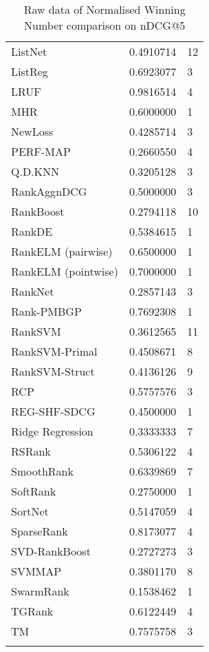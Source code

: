 \begin{longtable}{l|l|l}
ListNet & 0.4910714 & 12 \\ 
ListReg & 0.6923077 & 3 \\ 
LRUF & 0.9816514 & 4 \\ 
MHR & 0.6000000 & 1 \\ 
NewLoss & 0.4285714 & 3 \\ 
PERF-\acs{MAP} & 0.2660550 & 4 \\ 
Q.D.KNN & 0.3205128 & 3 \\ 
RankAgg\acs{nDCG} & 0.5000000 & 3 \\ 
RankBoost & 0.2794118 & 10 \\ 
RankDE & 0.5384615 & 1 \\ 
RankELM (pairwise) & 0.6500000 & 1 \\ 
RankELM (pointwise) & 0.7000000 & 1 \\ 
RankNet & 0.2857143 & 3 \\ 
Rank-PMBGP & 0.7692308 & 1 \\ 
Rank\acs{SVM} & 0.3612565 & 11 \\ 
Rank\acs{SVM}-Primal & 0.4508671 & 8 \\ 
Rank\acs{SVM}-Struct & 0.4136126 & 9 \\ 
RCP & 0.5757576 & 3 \\ 
REG-SHF-SDCG & 0.4500000 & 1 \\ 
Ridge Regression & 0.3333333 & 7 \\ 
RSRank & 0.5306122 & 4 \\ 
SmoothRank & 0.6339869 & 7 \\ 
SoftRank & 0.2750000 & 1 \\ 
SortNet & 0.5147059 & 4 \\ 
SparseRank & 0.8173077 & 4 \\ 
\acs{SVD}-RankBoost & 0.2727273 & 3 \\ 
\acs{SVM}\acs{MAP} & 0.3801170 & 8 \\ 
SwarmRank & 0.1538462 & 1 \\ 
TGRank & 0.6122449 & 4 \\ 
TM & 0.7575758 & 3 \\ 
\caption{Raw data of Normalised Winning Number comparison on \acs{nDCG}@5}
\label{tab:raw_data_norm_winnum_ndcg5}
\end{longtable}